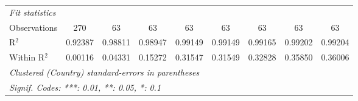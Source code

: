 \begin{table}[htbp]
\begin{tabular}{lcccccccc}
      \emph{Fit statistics}\\
      Observations                                                            & 270      & 63       & 63             & 63              & 63              & 63              & 63                     & 63\\  
      R$^2$                                                                   & 0.92387  & 0.98811  & 0.98947        & 0.99149         & 0.99149         & 0.99165         & 0.99202                & 0.99204\\  
      Within R$^2$                                                            & 0.00116  & 0.04331  & 0.15272        & 0.31547         & 0.31549         & 0.32828         & 0.35850                & 0.36006\\  
      \midrule \midrule
      \multicolumn{9}{l}{\emph{Clustered (Country) standard-errors in parentheses}}\\
      \multicolumn{9}{l}{\emph{Signif. Codes: ***: 0.01, **: 0.05, *: 0.1}}\\
   \end{tabular}
\end{table}


